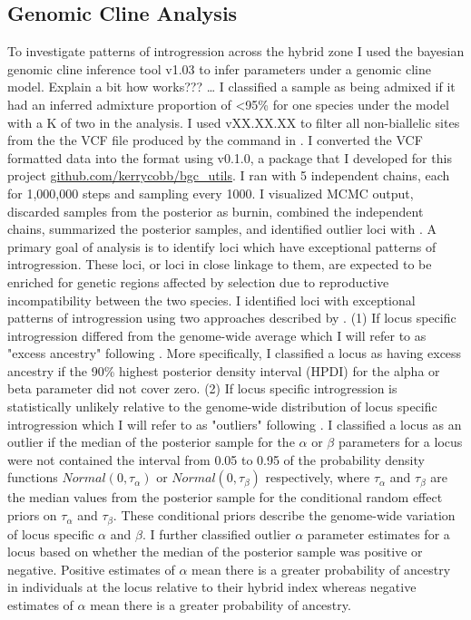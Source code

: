 \subsection{Genomic Cline Analysis}
To investigate patterns of introgression across the hybrid zone I     
used the bayesian genomic cline inference tool \bgc v1.03 \parencite{gompert2012} 
to infer parameters under a genomic cline model.
Explain a bit how \bgc works??? \ldots
I classified a sample as being admixed if it had an inferred admixture proportion
of <95\% for one species under the model with a K of two in 
the \structure analysis.
I used \vcftools vXX.XX.XX to filter all non-biallelic sites from the the VCF file 
produced by the \populations command in \stacks. 
I converted the VCF formatted data into the \bgc format using \bgcutils v0.1.0,  
a \python package that I developed for this project \url{github.com/kerrycobb/bgc_utils}.
I ran \bgc with 5 independent chains, each for 1,000,000 steps and sampling every 1000.
I visualized MCMC output, discarded samples from the posterior as burnin, combined the independent 
chains, summarized the posterior samples, and identified outlier loci with \bgcutils. 
A primary goal of \bgc analysis is to identify loci which have exceptional 
patterns of introgression. These loci, or loci in close linkage to them, are
expected to be enriched for genetic regions affected by selection due to 
reproductive incompatibility between the two species.
I identified loci with exceptional patterns of introgression using two approaches 
described by \cite{gompert2011}.
(1) If locus specific introgression differed from the genome-wide average which 
I will refer to as "excess ancestry" following \cite{gompert2011}.
More specifically, I classified a locus as having excess ancestry 
if the 90\% highest posterior density interval (HPDI) for the alpha or beta 
parameter did not cover zero.
(2) If locus specific introgression is statistically unlikely relative to the 
genome-wide distribution of locus specific introgression which I will refer to 
as "outliers" following \cite{gompert2011}.
I classified a locus as an outlier if the median of the posterior sample for the 
$\alpha$ or $\beta$ parameters for a locus were not contained 
the interval from 0.05 to 0.95 of the probability density functions $Normal(0, \tau_\alpha)$  
or $Normal(0, \tau_\beta)$ respectively, where $\tau_\alpha$ and $\tau_\beta$ are  
the median values from the posterior sample for the conditional random effect 
priors on $\tau_\alpha$ and $\tau_\beta$.
These conditional priors describe the genome-wide variation of locus specific 
$\alpha$ and $\beta$.
I further classified outlier $\alpha$ parameter estimates for a locus based on whether the 
median of the posterior sample was positive or negative. 
Positive estimates of $\alpha$ mean there is a greater probability of \amer 
ancestry in individuals at the locus relative to their hybrid index whereas negative 
estimates of $\alpha$ mean there is a greater probability of \terr ancestry. 

